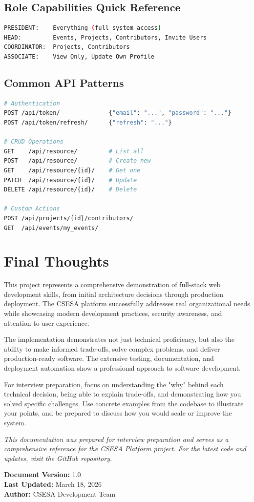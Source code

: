 \documentclass[11pt,a4paper]{article}
\begin{document}
\subsection{Role Capabilities Quick Reference}
\begin{lstlisting}[language=bash]
PRESIDENT:    Everything (full system access)
HEAD:         Events, Projects, Contributors, Invite Users
COORDINATOR:  Projects, Contributors
ASSOCIATE:    View Only, Update Own Profile
\end{lstlisting}

\subsection{Common API Patterns}
\begin{lstlisting}[language=bash]
# Authentication
POST /api/token/              {"email": "...", "password": "..."}
POST /api/token/refresh/      {"refresh": "..."}

# CRUD Operations
GET    /api/resource/         # List all
POST   /api/resource/         # Create new
GET    /api/resource/{id}/    # Get one
PATCH  /api/resource/{id}/    # Update
DELETE /api/resource/{id}/    # Delete

# Custom Actions
POST /api/projects/{id}/contributors/
GET  /api/events/my_events/
\end{lstlisting}

\section{Final Thoughts}

This project represents a comprehensive demonstration of full-stack web development skills, from initial architecture decisions through production deployment. The CSESA platform successfully addresses real organizational needs while showcasing modern development practices, security awareness, and attention to user experience.

The implementation demonstrates not just technical proficiency, but also the ability to make informed trade-offs, solve complex problems, and deliver production-ready software. The extensive testing, documentation, and deployment automation show a professional approach to software development.

For interview preparation, focus on understanding the "why" behind each technical decision, being able to explain trade-offs, and demonstrating how you solved specific challenges. Use concrete examples from the codebase to illustrate your points, and be prepared to discuss how you would scale or improve the system.

\vspace{1cm}

\textit{This documentation was prepared for interview preparation and serves as a comprehensive reference for the CSESA Platform project. For the latest code and updates, visit the GitHub repository.}

\vspace{0.5cm}

\textbf{Document Version:} 1.0 \\
\textbf{Last Updated:} March 18, 2026 \\
\textbf{Author:} CSESA Development Team
\end{document}
